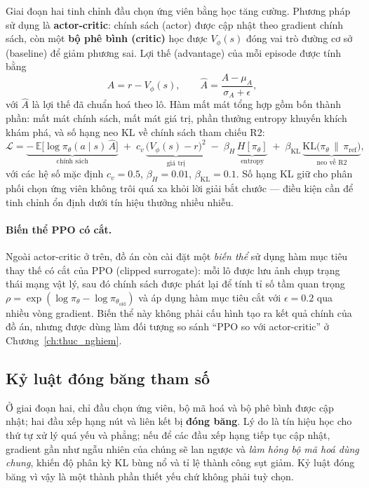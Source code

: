 \documentclass[../DoAn.tex]{subfiles}
\begin{document}
Giai đoạn hai tinh chỉnh đầu chọn ứng viên bằng học tăng cường. Phương pháp sử dụng là \textbf{actor-critic}: chính sách (actor) được cập nhật theo gradient chính sách, còn một \textbf{bộ phê bình (critic)} học được $V_\phi(s)$ đóng vai trò đường cơ sở (baseline) để giảm phương sai. Lợi thế (advantage) của mỗi episode được tính bằng
\begin{equation}
    A = r - V_\phi(s), \qquad \hat{A} = \frac{A - \mu_A}{\sigma_A + \epsilon},
    \label{eq:advantage}
\end{equation}
với $\hat{A}$ là lợi thế đã chuẩn hoá theo lô. Hàm mất mát tổng hợp gồm bốn thành phần: mất mát chính sách, mất mát giá trị, phần thưởng entropy khuyến khích khám phá, và số hạng neo KL về chính sách tham chiếu R2:
\begin{equation}
    \mathcal{L} = \underbrace{-\,\mathbb{E}\big[\log \pi_\theta(a\mid s)\,\hat{A}\big]}_{\text{chính sách}} \;+\; c_v\,\underbrace{\big(V_\phi(s) - r\big)^2}_{\text{giá trị}} \;-\; \beta_H\,\underbrace{H[\pi_\theta]}_{\text{entropy}} \;+\; \beta_{\text{KL}}\,\underbrace{\mathrm{KL}\big(\pi_\theta \,\|\, \pi_{\text{ref}}\big)}_{\text{neo về R2}},
    \label{eq:loss}
\end{equation}
với các hệ số mặc định $c_v=0.5$, $\beta_H=0.01$, $\beta_{\text{KL}}=0.1$. Số hạng KL giữ cho phân phối chọn ứng viên không trôi quá xa khỏi lời giải bắt chước — điều kiện cần để tinh chỉnh ổn định dưới tín hiệu thưởng nhiều nhiễu.

\paragraph{Biến thể PPO có cắt.} Ngoài actor-critic ở trên, đồ án còn cài đặt một \textit{biến thể} sử dụng hàm mục tiêu thay thế có cắt của PPO (clipped surrogate): mỗi lô được lưu ảnh chụp trạng thái mạng vật lý, sau đó chính sách được phát lại để tính tỉ số tầm quan trọng $\rho = \exp(\log\pi_\theta - \log\pi_{\theta_{\text{old}}})$ và áp dụng hàm mục tiêu cắt với $\epsilon=0.2$ qua nhiều vòng gradient. Biến thể này không phải cấu hình tạo ra kết quả chính của đồ án, nhưng được dùng làm đối tượng so sánh ``PPO so với actor-critic'' ở Chương~\ref{ch:thuc_nghiem}.

\subsection{Kỷ luật đóng băng tham số}
\label{subsec:train-freeze}

Ở giai đoạn hai, chỉ đầu chọn ứng viên, bộ mã hoá và bộ phê bình được cập nhật; hai đầu xếp hạng nút và liên kết bị \textbf{đóng băng}. Lý do là tín hiệu học cho thứ tự xử lý quá yếu và phẳng; nếu để các đầu xếp hạng tiếp tục cập nhật, gradient gần như ngẫu nhiên của chúng sẽ lan ngược và \textit{làm hỏng bộ mã hoá dùng chung}, khiến độ phân kỳ KL bùng nổ và tỉ lệ thành công sụt giảm. Kỷ luật đóng băng vì vậy là một thành phần thiết yếu chứ không phải tuỳ chọn.
\end{document}
